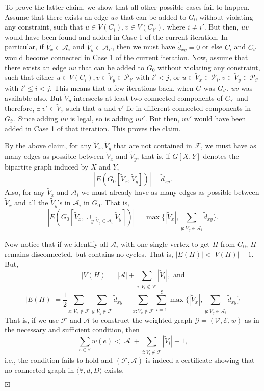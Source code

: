 \documentclass[12pt,a4paper]{article}
\theoremstyle{definition}
\theoremstyle{plain}
\newenvironment{prf}{\noindent {\bf Proof.}}{\begin{flushright}\vspace{-2em}\footnotesize$\boxdot$\normalsize\end{flushright}\smallskip}
\begin{document}
\begin{prf}
To prove the latter claim, 
we show that all other possible cases fail to happen. 
Assume that there exists an edge $uv$ that 
can be added to $G_0$ without violating any constraint, 
such that $u\in V(C_i),v\in V(C_{i'})$, where
$i\neq i'$. But then, 
$uv$ would have been found and added in Case 1 of the current iteration. 
In particular, if $\widetilde{V}_x\in \mathcal A_i$ 
and $\widetilde{V}_y\in \mathcal A_{i'}$, 
then we must have $\widetilde{d}_{xy}=0$ 
or else $C_i$ and $C_{i'}$ would become connected
in Case 1 of the current iteration.
Now, assume
that there exists an edge $uv$ 
that can be added to $G_0$ without violating any constraint, 
such that either $u\in V(C_i),v\in \widetilde{V}_y \in\mathcal P_{i'}$ 
with $i'<j$, or 
$u\in \widetilde{V}_x \in\mathcal P_{i},v\in \widetilde{V}_y 
\in\mathcal P_{i'}$ with $i'\leq i<j$.
This means that a few iterations back,
when $G$ was $G_{i'}$, $uv$ was available also. 
But $\widetilde{V}_y$ intersects at least two connected
components of $G_{i'}$ and therefore, 
$\exists\:v'\in \widetilde{V}_x$ such that $u$ and $v'$ lie in 
different connected components in $G_{i'}$. 
Since adding $uv$ is legal, so is adding $uv'$. 
But then,
$uv'$ would have been added in Case 1 of that iteration. This proves the claim.

By the above claim, for any $\widetilde{V}_x, \widetilde{V}_y$ that are not contained 
in $\mathcal F$,
we must have as many edges as possible between $\widetilde{V}_x$ and
$\widetilde{V}_y$, that is, if $G[ X,Y ]$ 
denotes the bipartite graph induced by $X$ and $Y$,
$$|E(G_0[\widetilde{V}_x,\widetilde{V}_y])|=\widetilde{d}_{xy}.$$ 
Also, for any $\widetilde{V}_x$ and 
$\mathcal A_i$ we must already have 
as many edges as possible between $\widetilde{V}_x$ and
all the $\widetilde{V}_y$'s in $\mathcal A_i$ in $G_0$. That is,
$$|E(G_0[\widetilde{V}_x,\cup_{y:\widetilde{V}_y\in \mathcal A_i}\widetilde{V}_y])|=
\max\{|\widetilde{V}_x|,\sum_{y:\widetilde{V}_y\in \mathcal A_i}\widetilde{d}_{xy}\}.$$ 

Now notice that if we identify all $\mathcal A_i$ 
with one single vertex to get $H$ from
$G_0$, $H$ remains disconnected, 
but contains no cycles. That is, $|E(H)|< |V(H)|-1$. 
But,
$$|V(H)|=|\mathcal A| + \sum_{i: \widetilde{V}_i\notin \mathcal F}|\widetilde{V}_i|, \text{ and}$$
$$|E(H)|=\frac{1}{2}\sum_{x: \widetilde{V}_x\notin \mathcal F} 
\sum_{y: \widetilde{V}_y\notin \mathcal F} 
\widetilde{d}_{xy} + \sum_{x: \widetilde{V}_x\notin \mathcal F}
\sum_{i=1}^{\xi}\max\{|\widetilde{V}_x|, \sum_{y:\widetilde{V}_y\in 
\mathcal A_i}\widetilde{d}_{xy}\}$$
That is, if we use $\mathcal F$ and $\mathcal A$ 
to construct the weighted graph 
$\mathcal G= (\mathcal V, \mathcal E, w)$ as in the necessary and sufficient condition, then 
$$\sum_{e\in\mathcal E} w(e) <
|\mathcal A | + 
\sum_{i: \widetilde{V}_i\notin \mathcal F} |\widetilde{V}_i| - 1,$$
i.e., the condition fails to hold and $(\mathcal F, \mathcal A)$ is indeed a 
certificate showing that no connected graph in 
$\langle{\mathbb V},d,D\rangle$ exists.


\end{prf}
\end{document}
